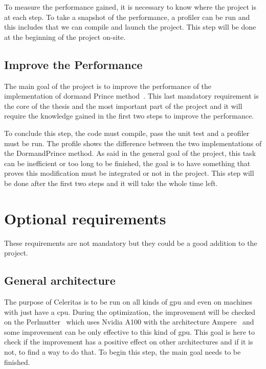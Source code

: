 To measure the performance gained, it is necessary to know where the project is at each step.
To take a snapshot of the performance, a profiler can be run and this includes that we can compile and launch the project.
This step will be done at the beginning of the project on-site.


\subsection{Improve the Performance}
\label{spec:ch:goals:mandatory-requirements:improve-the-performance}

The main goal of the project is to improve the performance of the implementation of dormand Prince method~\cite{princeDormand}.
This last mandatory requirement is the core of the thesis and the most important part of the project and it will require the knowledge gained in the first two steps to improve the performance.

To conclude this step, the code must compile, pass the unit test and a profiler must be run.
The profile shows the difference between the two implementations of the DormandPrince method.
As said in the general goal of the project, this task can be inefficient or too long to be finished, the goal is to have something that proves this modification must be integrated or not in the project.
This step will be done after the first two steps and it will take the whole time left.


\section{Optional requirements}
\label{spec:ch:goals:optional-requirements}

These requirements are not mandatory but they could be a good addition to the project.

\subsection{General architecture}
\label{spec:ch:goals:optional-requirements:general-optimization}

The purpose of Celeritas is to be run on all kinds of \acrshort{gpu} and even on machines with just have a \acrshort{cpu}.
During the optimization, the improvement will be checked on the Perlmutter~\cite{Perlmutter} which uses Nvidia A100 with the architecture Ampere~\cite{ampere} and some improvement can be only effective to this kind of \acrshort{gpu}.
This goal is here to check if the improvement has a positive effect on other architectures and if it is not, to find a way to do that.
To begin this step, the main goal needs to be finished.

